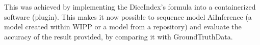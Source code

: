 This was achieved by implementing the \Gls{DiceIndex}'s formula into a containerized
software (plugin). This makes it now possible to sequence model \Gls{AiInference} (a
model created within \Gls{WIPP} or a model from a repository) and evaluate the
accuracy of the result provided, by comparing it with
\Gls{GroundTruthData}.
